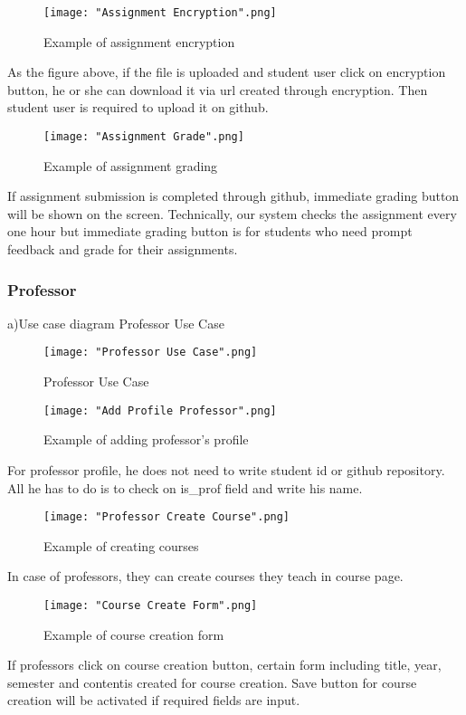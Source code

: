 \documentclass[10pt,journal,compsoc]{IEEEtran}
\begin{document}
\begin{figure}[H]
\centering
\texttt{[image: "Assignment Encryption".png]}
{\caption*{Example of assignment encryption}}
\end{figure}
As the figure above, if the file is uploaded and student user click on encryption button, he or she can download it via url created through encryption. Then student user is required to upload it on github.

\begin{figure}[H]
\centering
\texttt{[image: "Assignment Grade".png]}
{\caption*{Example of assignment grading}}
\end{figure}
If assignment submission is completed through github, immediate grading button will be shown on the screen. Technically, our system checks the assignment every one hour but immediate grading button is for students who need prompt feedback and grade for their assignments.  

\subsubsection {Professor}
\null\qquad a)Use case diagram
Professor Use Case

\begin{figure}[H]
\centering
\texttt{[image: "Professor Use Case".png]}
{\caption*{Professor Use Case}}
\end{figure}


\begin{figure}[H]
\centering
\texttt{[image: "Add Profile Professor".png]}
{\caption*{Example of adding professor's profile}}
\end{figure}
For professor profile, he does not need to write student id or github repository. All he has to do is to check on is\_prof field and write his name.

\begin{figure}[H]
\centering
\texttt{[image: "Professor Create Course".png]}
{\caption*{Example of creating courses}}
\end{figure}
In case of professors, they can create courses they teach in course page. 

\begin{figure}[H]
\centering
\texttt{[image: "Course Create Form".png]}
{\caption*{Example of course creation form}}
\end{figure}
If professors click on course creation button, certain form including title, year, semester and contentis created for course creation. Save button for course creation will be activated if required fields are input. 
\end{document}
